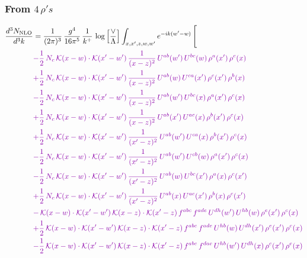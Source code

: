 \documentclass[10pt]{article}
\numberwithin{equation}{section}
\begin{document}
\subsubsection*{From $4\, \rho's$}
\begin{align}
\frac{d^{3}N_{\mathrm{NLO}}}{d^{3}k} & = \frac{1}{(2\pi)^{3}}\,\frac{g^{4}}{16\pi^{5}}\,\frac{1}{k^{+}}\,\log\Big[\frac{\vee}{\Lambda}\Big]\int_{x,x',z,w,w'}e^{-ik(w'-w)}\,\Bigg[\notag\\ &{\color{CC} -\frac{1}{2}\,N_{c}\,\mathcal{K}(x-w)\cdot\mathcal{K}(x'-w')\,\frac{1}{(x-z)^{2}}\,U^{ab}(w')\,U^{bc}(w)\,\rho^{a}(x')\,\rho^{c}(x)} \notag\\
&{\color{CC} +\frac{1}{2}\,N_{c}\,\mathcal{K}(x-w)\cdot\mathcal{K}(x'-w')\,\frac{1}{(x-z)^{2}}\,U^{ab}(w)\,U^{ca}(x')\,\rho^{c}(x')\,\rho^{b}(x)} \notag\\
&{\color{CC} -\frac{1}{2}\,N_{c}\,\mathcal{K}(x-w)\cdot\mathcal{K}(x'-w')\,\frac{1}{(x-z)^{2}}\,U^{ab}(w')\,U^{bc}(x)\,\rho^{a}(x')\,\rho^{c}(x)} \notag\\
&{\color{CC} +\frac{1}{2}\,N_{c}\,\mathcal{K}(x-w)\cdot\mathcal{K}(x'-w')\,\frac{1}{(x-z)^{2}}\,U^{ab}(x')\,U^{ac}(x)\,\rho^{b}(x')\,\rho^{c}(x)} \notag\\
&{\color{CC} +\frac{1}{2}\,N_{c}\,\mathcal{K}(x-w)\cdot\mathcal{K}(x'-w')\,\frac{1}{(x'-z)^{2}}\,U^{ab}(w')\,U^{ca}(x)\,\rho^{b}(x')\,\rho^{c}(x)} \notag\\
&{\color{CC} -\frac{1}{2}\,N_{c}\,\mathcal{K}(x-w)\cdot\mathcal{K}(x'-w')\,\frac{1}{(x'-z)^{2}}\,U^{ab}(w')\,U^{cb}(w)\,\rho^{a}(x')\,\rho^{c}(x)} \notag\\
&{\color{CC} -\frac{1}{2}\,N_{c}\,\mathcal{K}(x-w)\cdot\mathcal{K}(x'-w')\,\frac{1}{(x'-z)^{2}}\,U^{ab}(w)\,U^{bc}(x')\,\rho^{a}(x)\,\rho^{c}(x')} \notag\\
&{\color{CC} +\frac{1}{2}\,N_{c}\,\mathcal{K}(x-w)\cdot\mathcal{K}(x'-w')\,\frac{1}{(x'-z)^{2}}\,U^{ab}(x)\,U^{ac}(x')\,\rho^{b}(x)\,\rho^{c}(x')} \notag\\
&{\color{CC} -\,\mathcal{K}(x-w)\cdot\mathcal{K}(x'-w')\,\mathcal{K}(x-z)\cdot\mathcal{K}(x'-z)\,f^{abc}\,f^{ade}\,U^{dh}(w')\,U^{hb}(w)\,\rho^{e}(x')\,\rho^{c}(x)} \notag\\
&{\color{CC} +\frac{1}{2}\,\mathcal{K}(x-w)\cdot\mathcal{K}(x'-w')\,\mathcal{K}(x-z)\cdot\mathcal{K}(x'-z)\,f^{abc}\,f^{ade}\,U^{hb}(w)\,U^{dh}(x')\,\rho^{e}(x')\,\rho^{c}(x)} \notag\\
&{\color{CC} -\frac{1}{2}\,\mathcal{K}(x-w)\cdot\mathcal{K}(x'-w')\,\mathcal{K}(x-z)\cdot\mathcal{K}(x'-z)\,f^{abc}\,f^{dae}\,U^{hb}(w')\,U^{dh}(x)\,\rho^{c}(x')\,\rho^{e}(x)} \notag\\

\end{align}
\end{document}
